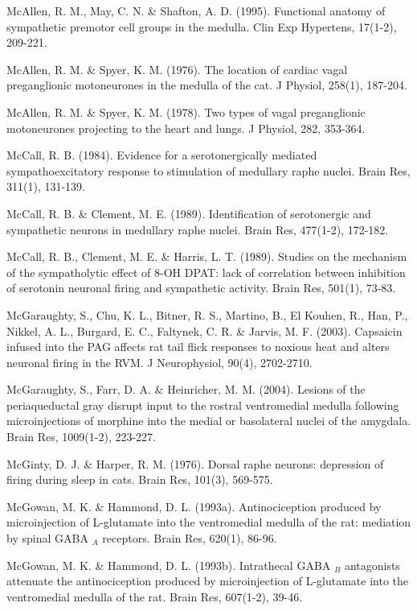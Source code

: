 \documentclass[a4paper,12pt,twoside]{report}
\begin{document}
\begin{singlespacing}
\begin{footnotesize}
McAllen, R. M., May, C. N. \& Shafton, A. D. (1995). Functional anatomy of sympathetic premotor cell groups in the medulla. Clin Exp Hypertens, 17(1-2), 209-221.

McAllen, R. M. \& Spyer, K. M. (1976). The location of cardiac vagal preganglionic motoneurones in the medulla of the cat. J Physiol, 258(1), 187-204.

McAllen, R. M. \& Spyer, K. M. (1978). Two types of vagal preganglionic motoneurones projecting to the heart and lungs. J Physiol, 282, 353-364.

McCall, R. B. (1984). Evidence for a serotonergically mediated sympathoexcitatory response to stimulation of medullary raphe nuclei. Brain Res, 311(1), 131-139.

McCall, R. B. \& Clement, M. E. (1989). Identification of serotonergic and sympathetic neurons in medullary raphe nuclei. Brain Res, 477(1-2), 172-182.

McCall, R. B., Clement, M. E. \& Harris, L. T. (1989). Studies on the mechanism of the sympatholytic effect of 8-OH DPAT: lack of correlation between inhibition of serotonin neuronal firing and sympathetic activity. Brain Res, 501(1), 73-83.

McGaraughty, S., Chu, K. L., Bitner, R. S., Martino, B., El Kouhen, R., Han, P., Nikkel, A. L., Burgard, E. C., Faltynek, C. R. \& Jarvis, M. F. (2003). Capsaicin infused into the PAG affects rat tail flick responses to noxious heat and alters neuronal firing in the RVM. J Neurophysiol, 90(4), 2702-2710.

McGaraughty, S., Farr, D. A. \& Heinricher, M. M. (2004). Lesions of the periaqueductal gray disrupt input to the rostral ventromedial medulla following microinjections of morphine into the medial or basolateral nuclei of the amygdala. Brain Res, 1009(1-2), 223-227.

McGinty, D. J. \& Harper, R. M. (1976). Dorsal raphe neurons: depression of firing during sleep in cats. Brain Res, 101(3), 569-575.

McGowan, M. K. \& Hammond, D. L. (1993a). Antinociception produced by microinjection of L-glutamate into the ventromedial medulla of the rat: mediation by spinal GABA $_{A}$ receptors. Brain Res, 620(1), 86-96.

McGowan, M. K. \& Hammond, D. L. (1993b). Intrathecal GABA $_{B}$ antagonists attenuate the antinociception produced by microinjection of L-glutamate into the ventromedial medulla of the rat. Brain Res, 607(1-2), 39-46.


\end{footnotesize}
\end{singlespacing}
\end{document}
